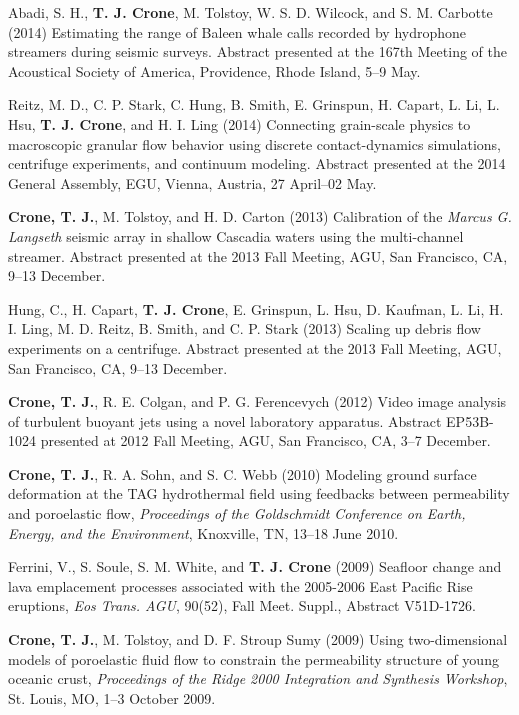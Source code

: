 \documentclass[11pt]{res}
\begin{document}
\begin{resume}
Abadi, S. H., {\bf T. J. Crone}, M. Tolstoy, W. S. D. Wilcock, and S. M. Carbotte (2014) Estimating the range of Baleen whale calls recorded by hydrophone streamers during seismic surveys. Abstract presented at the 167th Meeting of the Acoustical Society of America, Providence, Rhode Island, 5--9 May.

Reitz, M. D., C. P. Stark, C. Hung, B. Smith, E. Grinspun, H. Capart, L. Li, L. Hsu, {\bf T. J. Crone}, and H. I. Ling (2014) Connecting grain-scale physics to macroscopic granular flow behavior using discrete contact-dynamics simulations, centrifuge experiments, and continuum modeling. Abstract presented at the 2014 General Assembly, EGU, Vienna, Austria, 27 April--02 May.

{\bf Crone, T. J.}, M. Tolstoy, and H. D. Carton (2013) Calibration of the {\em Marcus G. Langseth} seismic array in shallow Cascadia waters using the multi-channel streamer. Abstract presented at the 2013 Fall Meeting, AGU, San Francisco, CA, 9--13 December.

Hung, C., H. Capart, {\bf T. J. Crone}, E. Grinspun, L. Hsu, D. Kaufman, L. Li, H. I. Ling, M. D. Reitz, B. Smith, and C. P. Stark (2013) Scaling up debris flow experiments on a centrifuge. Abstract presented at the 2013 Fall Meeting, AGU, San Francisco, CA, 9--13 December.

{\bf Crone, T. J.}, R. E. Colgan, and P. G. Ferencevych (2012) Video image analysis of turbulent buoyant jets using a novel laboratory apparatus. Abstract EP53B-1024 presented at 2012 Fall Meeting, AGU, San Francisco, CA, 3--7 December.

{\bf Crone, T. J.}, R. A. Sohn, and S. C. Webb (2010) Modeling ground surface deformation at the TAG hydrothermal field using feedbacks between permeability and poroelastic flow, {\em Proceedings of the Goldschmidt Conference on Earth, Energy, and the Environment}, Knoxville, TN, 13--18 June 2010.

Ferrini, V., S. Soule, S. M. White, and {\bf T. J. Crone} (2009) Seafloor change and lava emplacement processes associated with the 2005-2006 East Pacific Rise eruptions, {\em Eos Trans. AGU}, 90(52), Fall Meet. Suppl., Abstract V51D-1726.

{\bf Crone, T. J.}, M. Tolstoy, and D. F. Stroup Sumy (2009) Using two-dimensional models of poroelastic fluid flow to constrain the permeability structure of young oceanic crust, {\em Proceedings of the Ridge 2000 Integration and Synthesis Workshop}, St. Louis, MO, 1--3 October 2009.


\end{resume}
\end{document}
